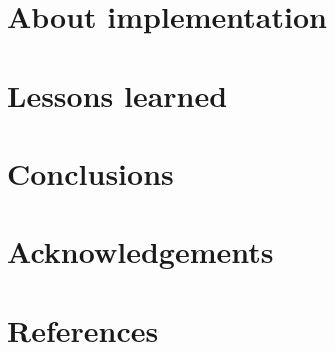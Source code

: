 \documentclass{netobjectdays}
\begin{document}
\section{About implementation}

\section{Lessons learned}

\section{Conclusions}
\section{Acknowledgements}
\section{References}

 
\end{document}
